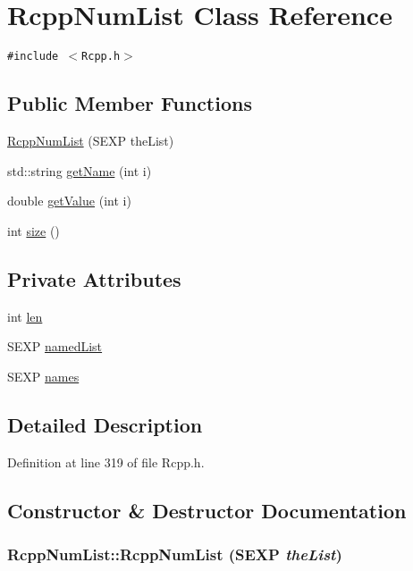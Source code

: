 \hypertarget{classRcppNumList}{
\section{RcppNumList Class Reference}
\label{classRcppNumList}
}
{\tt \#include $<$Rcpp.h$>$}

\subsection*{Public Member Functions}
\begin{CompactItemize}
\item 
\hyperlink{classRcppNumList_4a8a321d0dc84b6d4be988005fa74fcd}{RcppNumList} (SEXP theList)
\item 
std::string \hyperlink{classRcppNumList_246d8e534d97fbe798b8567bbfa93ca7}{getName} (int i)
\item 
double \hyperlink{classRcppNumList_2e83950933ddc73ad64ed800f6f5e23b}{getValue} (int i)
\item 
int \hyperlink{classRcppNumList_18dc0660cc827bcf17d9738cb5874db7}{size} ()
\end{CompactItemize}
\subsection*{Private Attributes}
\begin{CompactItemize}
\item 
int \hyperlink{classRcppNumList_c4cb5c784f7105f0f28ae48d02deb3a1}{len}
\item 
SEXP \hyperlink{classRcppNumList_7464927aafe555a0c4a104247dba7185}{namedList}
\item 
SEXP \hyperlink{classRcppNumList_a669b28cba0c95531a3c92910a60ecb0}{names}
\end{CompactItemize}


\subsection{Detailed Description}


Definition at line 319 of file Rcpp.h.

\subsection{Constructor \& Destructor Documentation}
\hypertarget{classRcppNumList_4a8a321d0dc84b6d4be988005fa74fcd}{
\subsubsection[{RcppNumList}]{\setlength{\rightskip}{0pt plus 5cm}RcppNumList::RcppNumList (SEXP {\em theList})}}
\label{classRcppNumList_4a8a321d0dc84b6d4be988005fa74fcd}




